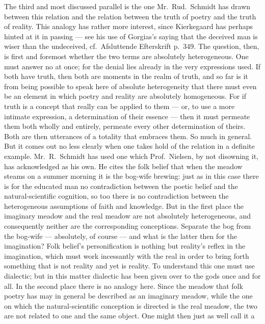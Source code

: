 \documentclass[12pt,a4paper]{book}
\newcommand{\opage}[1]{\marginnote{\footnotesize\textit{[#1]}}}
\begin{document}
The third and most discussed parallel is the one Mr.\ Rud.\ Schmidt has drawn
between this relation and the relation between the truth of poetry and the
truth of reality. This analogy has rather more interest, since
\opage{40}Kierkegaard has perhaps hinted at it in passing --- see his use of
Gorgias's saying that the deceived man is wiser than the undeceived, cf.\
Afsluttende Efterskrift p.\ 349. The question, then, is first and foremost
whether the two terms are absolutely heterogeneous. One must answer no at once;
for the denial lies already in the very expressions used. If both have truth,
then both are moments in the realm of truth, and so far is it from being
possible to speak here of absolute heterogeneity that there must even be an
element in which poetry and reality are absolutely homogeneous. For if truth is
a concept that really can be applied to them --- or, to use a more intimate
expression, a determination of their essence --- then it must permeate them
both wholly and entirely, permeate every other determination of theirs. Both
are then utterances of a totality that embraces them. So much in general. But
it comes out no less clearly when one takes hold of the relation in a definite
example. Mr.\ R.\ Schmidt has used one which Prof.\ Nielsen, by not disowning
it, has acknowledged as his own. He cites the folk belief that when the meadow
steams on a summer morning it is the bog-wife brewing: just as in this case
there is for the educated man no contradiction between the poetic belief and
the natural-scientific cognition, so too there is no contradiction between the
heterogeneous assumptions of faith and knowledge. But in the first place the
imaginary meadow and the real
\opage{41}meadow are not absolutely heterogeneous, and consequently neither are
the corresponding conceptions. Separate the bog from the bog-wife --- absolutely,
of course --- and what is the latter then for the imagination? Folk belief's
personification is nothing but reality's reflex in the imagination, which must
work incessantly with the real in order to bring forth something that is not
reality and yet is reality. To understand this one must use dialectic; but in
this matter dialectic has been given over to the gods once and for all. In the
second place there is no analogy here. Since the meadow that folk poetry has
may in general be described as an imaginary meadow, while the one on which the
natural-scientific conception is directed is the real meadow, the two are not
related to one and the same object. One might then just as well call it a
\end{document}
